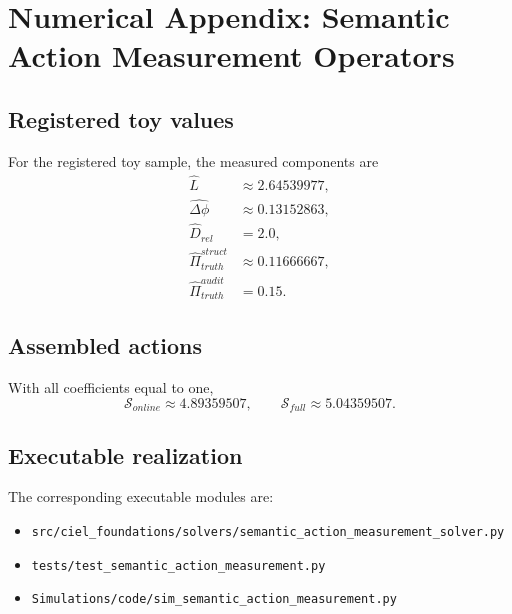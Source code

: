 \appendix
\section{Numerical Appendix: Semantic Action Measurement Operators}
\label{app:semantic-action-measurement}

\subsection{Registered toy values}
For the registered toy sample, the measured components are
\begin{align}
\widehat L &\approx 2.64539977,\\
\widehat{\Delta\phi} &\approx 0.13152863,\\
\widehat D_{rel} & = 2.0,\\
\widehat\Pi_{truth}^{struct} &\approx 0.11666667,\\
\widehat\Pi_{truth}^{audit} & = 0.15.
\end{align}

\subsection{Assembled actions}
With all coefficients equal to one,
\begin{equation}
\mathcal S_{online} \approx 4.89359507,
\qquad
\mathcal S_{full} \approx 5.04359507.
\end{equation}

\subsection{Executable realization}
The corresponding executable modules are:
\begin{itemize}
  \item \texttt{src/ciel\_foundations/solvers/semantic\_action\_measurement\_solver.py}
  \item \texttt{tests/test\_semantic\_action\_measurement.py}
  \item \texttt{Simulations/code/sim\_semantic\_action\_measurement.py}
\end{itemize}
